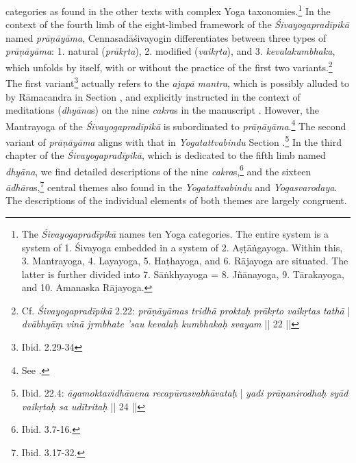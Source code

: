 categories as found in the other texts with complex Yoga taxonomies.\footnote{The \textit{Śivayogapradīpikā} names ten Yoga categories. The entire system is a system of 1. Śivayoga embedded in a system of 2. Aṣṭāṅgayoga. Within this, 3. Mantrayoga, 4. Layayoga, 5. Haṭhayoga, and 6. Rājayoga are situated. The latter is further divided into 7. Sāṅkhyayoga = 8. Jñānayoga, 9. Tārakayoga, and 10. Amanaska Rājayoga.}
In the context of the fourth limb of the eight-limbed framework of the \emph{Śivayogapradīpikā} named \textit{prāṇāyāma}, Cennasadāśivayogin differentiates between three types of \textit{prāṇāyāma}: 1. natural (\textit{prākṛta}), 2. modified (\textit{vaikṛta}), and 3. \textit{kevalakumbhaka}, which unfolds by itself, with or without the practice of the first two variants.\footnote{Cf. \textit{Śivayogapradīpikā} 2.22: \textit{prāṇāyāmas tridhā proktaḥ prākṛto vaikṛtas tathā} | \textit{dvābhyāṃ vinā jṛmbhate 'sau kevalaḥ kumbhakaḥ svayam} || 22 ||} The first variant\footnote{Ibid. 2.29-34} actually refers to the \textit{ajapā mantra}, which is possibly alluded to by Rāmacandra in Section , and explicitly instructed in the context of meditations (\textit{dhyāna}s) on the nine \textit{cakra}s in the manuscript . However, the Mantrayoga of the \textit{Śivayogapradīpikā} is subordinated to \textit{prāṇāyāma}.\footnote{See \citeauthor[2023: 205]{powell2023}.} The second variant of \textit{prāṇāyāma} aligns with that in \textit{Yogatattvabindu} Section .\footnote{Ibid. 22.4: \textit{āgamoktavidhānena recapūrasvabhāvataḥ} | \textit{yadi prāṇanirodhaḥ syād vaikṛtaḥ sa udītritaḥ} || 24 ||} In the third chapter of the \textit{Śivayogapradīpikā}, which is dedicated to the fifth limb named \textit{dhyāna}, we find detailed descriptions of the nine \textit{cakra}s,\footnote{Ibid. 3.7-16.} and the sixteen \textit{ādhāra}s,\footnote{Ibid. 3.17-32.} central themes also found in the \textit{Yogatattvabindu} and \textit{Yogasvarodaya}. The descriptions of the individual elements of both themes are largely congruent.


